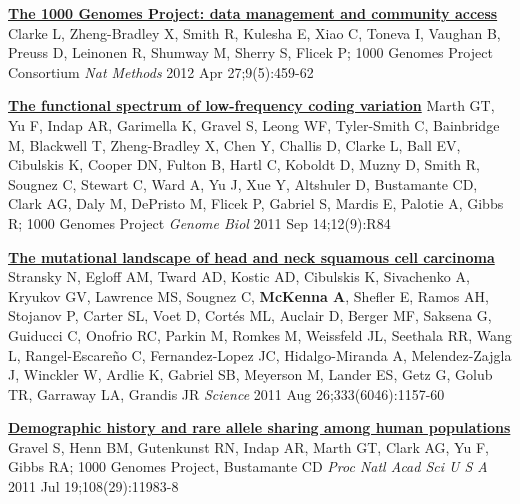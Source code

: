 \documentclass[9pt]{article}
\begin{document}
\noindent\href{https://www.ncbi.nlm.nih.gov/pubmed/22543379}{\bf  The 1000 Genomes Project: data management and community access}\vspace{-0.03in}
\newline\noindent Clarke L, Zheng-Bradley X, Smith R, Kulesha E, Xiao C, Toneva I, Vaughan B, Preuss D, Leinonen R, Shumway M, Sherry S, Flicek P; 1000 Genomes Project Consortium
\newline\noindent\emph{ Nat Methods} 2012 Apr 27;9(5):459-62
\bigskip

\noindent\href{https://www.ncbi.nlm.nih.gov/pubmed/21917140}{\bf  The functional spectrum of low-frequency coding variation}\vspace{-0.03in}
\newline\noindent Marth GT, Yu F, Indap AR, Garimella K, Gravel S, Leong WF, Tyler-Smith C, Bainbridge M, Blackwell T, Zheng-Bradley X, Chen Y, Challis D, Clarke L, Ball EV, Cibulskis K, Cooper DN, Fulton B, Hartl C, Koboldt D, Muzny D, Smith R, Sougnez C, Stewart C, Ward A, Yu J, Xue Y, Altshuler D, Bustamante CD, Clark AG, Daly M,  DePristo M, Flicek P, Gabriel S, Mardis E, Palotie A, Gibbs R; 1000 Genomes Project
\newline\noindent\emph{ Genome Biol}  2011 Sep 14;12(9):R84
\bigskip

\noindent\href{https://www.ncbi.nlm.nih.gov/pubmed/21798893}{\bf  The mutational landscape of head and neck squamous cell  carcinoma}\vspace{-0.03in}
\newline\noindent Stransky N, Egloff AM, Tward AD, Kostic AD, Cibulskis K, Sivachenko A, Kryukov GV, Lawrence MS, Sougnez C, \textbf{McKenna A}, Shefler E, Ramos AH, Stojanov P, Carter SL, Voet D, Cortés ML, Auclair D, Berger MF, Saksena G, Guiducci C, Onofrio RC, Parkin M, Romkes M, Weissfeld JL, Seethala RR, Wang L, Rangel-Escareño C, Fernandez-Lopez JC, Hidalgo-Miranda A, Melendez-Zajgla J, Winckler W, Ardlie K, Gabriel SB, Meyerson M, Lander ES, Getz G, Golub TR, Garraway LA, Grandis JR
\newline\noindent\emph{ Science} 2011 Aug 26;333(6046):1157-60
\bigskip

\noindent\href{https://www.ncbi.nlm.nih.gov/pubmed/21730125}{\bf  Demographic history and rare allele sharing among human populations}\vspace{-0.03in}
\newline\noindent Gravel S, Henn BM, Gutenkunst RN, Indap AR, Marth GT, Clark AG, Yu F, Gibbs RA; 1000 Genomes Project, Bustamante CD
\newline\noindent\emph{ Proc Natl Acad Sci U S A} 2011 Jul 19;108(29):11983-8
\bigskip
\end{document}

